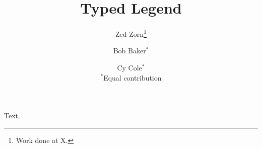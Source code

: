 \documentclass{article}
\title{Typed Legend}
\author{Zed Zorn\thanks{Work done at X.} \and Bob Baker$^{*}$ \and Cy Cole$^{*}$\\ $^*$Equal contribution}
\begin{document}
\maketitle
Text.
\end{document}
